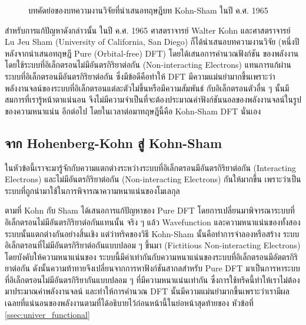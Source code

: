 \begin{figure}[H]
    \centering
    \caption{บทคัดย่อของบทความงานวิจัยที่นำเสนอทฤษฎีบท Kohn-Sham ในปี ค.ศ. 1965}
    \label{fig:kohn_sham_abs}
\end{figure}

สำหรับการแก้ปัญหาดังกล่าวนั้น ในปี ค.ศ. 1965 ศาสตราจารย์ Walter Kohn และศาสตราจารย์ Lu Jeu Sham (University of California, 
San Diego) ก็ได้นำเสนอบทความงานวิจัย (หนึ่งปีหลังจากนำเสนอทฤษฎี Pure (Orbital-free) DFT) โดยได้เสนอการคำนวณฟังก์ชัน%
ของพลังงานโดยใช้ระบบที่อิเล็กตรอนไม่มีอันตรกิริยาต่อกัน (Non-interacting Electrons) แทนการแก้ผ่านระบบที่อิเล็กตรอนมีอันตรกิริยาต่อกัน%
\autocite{kohn1965} ซึ่งมีข้อดีคือทำให้ DFT มีความแม่นยำมากขึ้นเพราะว่าพลังงานจลน์ของระบบที่อิเล็กตรอนแต่ละตัวไม่ขึ้นหรือมีความสัมพันธ์%
กับอิเล็กตรอนตัวอื่น ๆ นั้นมีสมการที่เรารู้หน้าตาแน่นอน จึงไม่มีความจำเป็นที่จะต้องประมาณค่าฟังก์ชันนอลของพลังงานจลน์ในรูปของความหนาแน่น%
อีกต่อไป โดยในเวลาต่อมาทฤษฎีนี้คือ Kohn-Sham DFT นั่นเอง

\subsection{จาก Hohenberg-Kohn สู่ Kohn-Sham}
\label{ssec:from_hk_to_ks}

ในหัวข้อนี้เราจะมารู้จักกับความแตกต่างระหว่างระบบที่อิเล็กตรอนมีอันตรกิริยาต่อกัน (Interacting Electrons) และไม่มีอันตรกิริยาต่อกัน 
(Non-interacting Electrons) กันให้มากขึ้น เพราะว่าเป็นระบบที่ถูกนำมาใช้ในการพิจารณาความหนาแน่นของโมเลกุล

ตามที่ Kohn กับ Sham ได้เสนอการแก้ปัญหาของ Pure DFT โดยการเปลี่ยนมาพิจารณาระบบที่อิเล็กตรอนไม่มีอันตรกิริยาต่อกันแทนนั้น จริง ๆ 
แล้ว Wavefunction และความหนาแน่นของทั้งสองระบบนั้นแตกต่างกันอย่างสิ้นเชิง แต่ว่าทริคของวิธี Kohn-Sham นั้นคือทำการจำลองหรือสร้าง%
ระบบอิเล็กตรอนที่ไม่มีอันตรกิริยาต่อกันแบบปลอม ๆ ขึ้นมา (Fictitious Non-interacting Electrons) โดยบังคับให้ความหนาแน่นของ%
ระบบนี้มีค่าเท่ากันกับความหนาแน่นของระบบที่อิเล็กตรอนมีอัตตรกิริยาต่อกัน ดังนั้นความท้าทายจึงเปลี่ยนจากการหาฟังก์ชันสากลสำหรับ Pure DFT 
มาเป็นการหาระบบที่อิเล็กตรอนไม่มีอันตรกิริยากันแบบปลอม ๆ ที่มีความหนาแน่นเท่ากัน ซึ่งการใช้ทริคนี้ทำให้เราไม่ต้องมาประมาณค่าพลังงานจลน์%
และทำให้การคำนวณ DFT นั้นมีความแม่นยำมากขึ้นเพราะว่าเรามีผลเฉลยที่แน่นอนของพลังงานตามที่ได้อธิบายไว้ก่อนหน้านี้ในย่อหน้าสุดท้ายของ%
หัวข้อที่ \ref{ssec:univer_functional}

